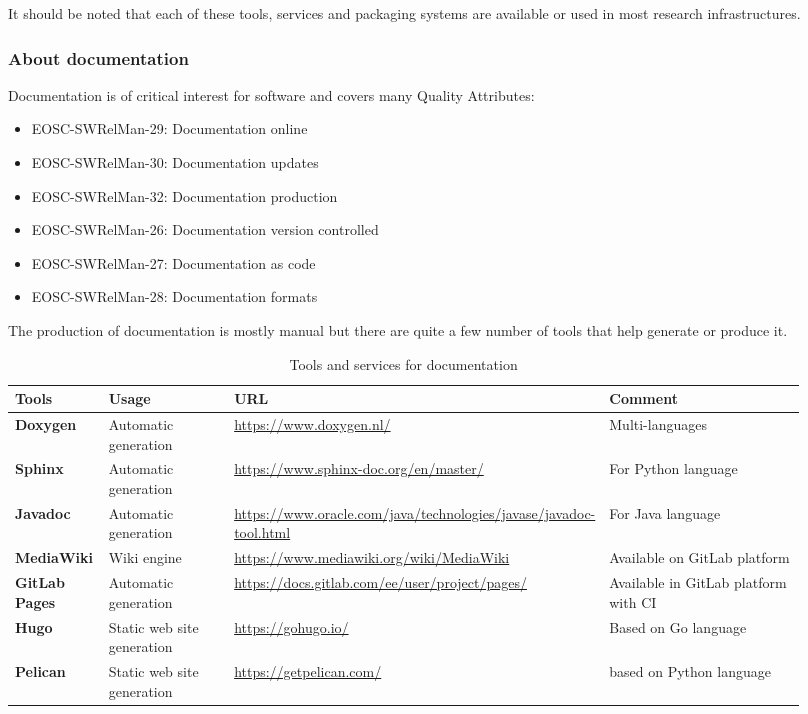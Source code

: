 It should be noted that each of these tools, services and packaging systems are available or used in most research infrastructures.

\subsubsection{About documentation}

Documentation is of critical interest for software and covers many Quality Attributes: 

\begin{itemize}
  \item EOSC-SWRelMan-29: Documentation online
  \item EOSC-SWRelMan-30: Documentation updates
  \item EOSC-SWRelMan-32: Documentation production
  \item EOSC-SWRelMan-26: Documentation version controlled
  \item EOSC-SWRelMan-27: Documentation as code
  \item EOSC-SWRelMan-28: Documentation formats
\end{itemize}

The production of documentation is mostly manual but there are quite a few number of tools that help generate or produce it.

\begin{center}
\begin{table}[h]

  \small
  \begin{tabular}{|p{0.12\linewidth}|p{0.2\linewidth}|p{0.25\linewidth}|p{0.35\linewidth}|} \hline

    \textbf{Tools} & \textbf{Usage} & \textbf{URL} & \textbf{Comment} \\ \hline \hline
    \textbf{Doxygen} & Automatic generation & \url{https://www.doxygen.nl/} & Multi-languages \\ \hline
    \textbf{Sphinx} & Automatic generation & \url{https://www.sphinx-doc.org/en/master/} & For Python language \\ \hline
    \textbf{Javadoc} & Automatic generation & \url{https://www.oracle.com/java/technologies/javase/javadoc-tool.html} & For Java language  \\ \hline
    \textbf{MediaWiki} & Wiki engine & \url{https://www.mediawiki.org/wiki/MediaWiki} &  Available on GitLab platform \\ \hline
    \textbf{GitLab Pages} & Automatic generation & \url{https://docs.gitlab.com/ee/user/project/pages/} & Available in GitLab platform with CI  \\ \hline
    \textbf{Hugo} & Static web site generation & \url{https://gohugo.io/} & Based on Go language \\ \hline
    \textbf{Pelican} & Static web site generation & \url{https://getpelican.com/} & based on Python language \\ \hline

  \end{tabular}
  \caption{Tools and services for documentation}
  \label{tab:tools_pack02}
\end{table}
\end{center}

